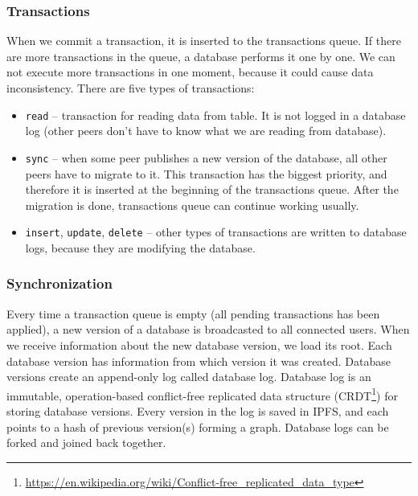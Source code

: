 \subsubsection{Transactions}
When we commit a transaction, it is inserted to the transactions queue. If there are more transactions in the queue, a database performs it one by one. We can not execute more transactions in one moment, because it could cause data inconsistency. There are five types of transactions:
\begin{itemize}
    \item \texttt{read} -- transaction for reading data from table. It is not logged in a database log (other peers don't have to know what we are reading from database).
    \item \texttt{sync} -- when some peer publishes a new version of the database, all other peers have to migrate to it. This transaction has the biggest priority, and therefore it is inserted at the beginning of the transactions queue. After the migration is done, transactions queue can continue working usually.
    \item \texttt{insert}, \texttt{update}, \texttt{delete} -- other types of transactions are written to database logs, because they are modifying the database.
\end{itemize}

\subsubsection{Synchronization} 
\label{designSync}
Every time a transaction queue is empty (all pending transactions has been applied), a new version of a database is broadcasted to all connected users. When we receive information about the new database version, we load its root. Each database version has information from which version it was created. Database versions create an append-only log called database log. Database log is an immutable, operation-based conflict-free replicated data structure (CRDT\footnote{\url{https://en.wikipedia.org/wiki/Conflict-free_replicated_data_type}}) for storing database versions. Every version in the log is saved in IPFS, and each points to a hash of previous version(s) forming a graph. Database logs can be forked and joined back together.\cite{crdtLog}

